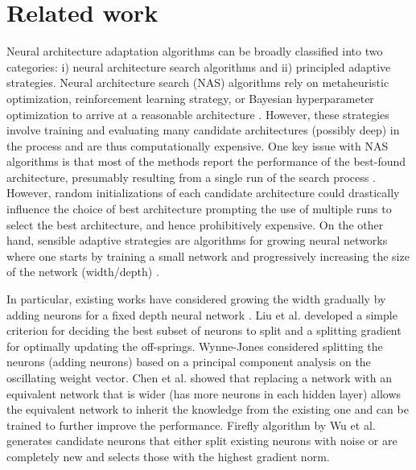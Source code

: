 \section{Related work}
Neural architecture adaptation algorithms can be broadly classified into two categories: i) neural architecture search algorithms and ii) principled adaptive strategies. 
Neural architecture search (NAS) algorithms rely on metaheuristic optimization,  reinforcement learning strategy, or Bayesian hyperparameter optimization to arrive at a reasonable architecture \cite{zoph2016neural, stanley2002evolving, suganuma2017genetic, elsken2018efficient, real2019regularized, balaprakash2018deephyper, miikkulainen2019evolving, liu2021survey,li2020random,kandasamy2018neural}. However, these strategies involve training and evaluating many candidate architectures (possibly deep) in the process and are thus computationally expensive. One key issue with NAS algorithms is that most of the methods report the performance of the best-found architecture, presumably resulting from a single run of the search process \cite{li2020random}. However,  random initializations of each candidate architecture could drastically influence the choice of best architecture prompting the use of multiple runs to select the best architecture, and hence prohibitively expensive. 
On the other hand, sensible adaptive strategies  are algorithms for growing neural networks where one
starts by training a small network and progressively increasing the size of the network (width/depth) \cite{wu2019splitting, wynne1993node,wu2020firefly,evci2022gradmax,krishnanunni2022layerwise,chen2015net2net}.

In particular, existing works have considered growing the width gradually by adding neurons for a fixed depth neural network \cite{wu2019splitting, wynne1993node,maile2022and,evci2022gradmax}. Liu et al. \cite{wu2019splitting} developed a simple criterion for
deciding the best subset of neurons to split and a splitting gradient for optimally updating the off-springs.  Wynne-Jones \cite{wynne1993node}  considered splitting the neurons (adding neurons) based on a principal component analysis on the oscillating weight vector.  Chen et al. \cite{chen2015net2net} showed that replacing a network with an equivalent network that is wider (has more neurons in
each hidden layer) allows the equivalent network to inherit the knowledge from the existing one and can be trained to further improve the performance. Firefly algorithm by Wu et al. \cite{wu2020firefly} generates candidate neurons that either split existing
neurons with noise or are completely new and selects those with the highest gradient norm.



